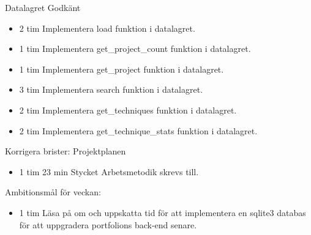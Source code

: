 \documentclass{TDP003mall}
\begin{document}
Datalagret Godkänt
\begin{itemize}
\item 2 tim Implementera load funktion i datalagret.
\item 1 tim Implementera get\_project\_count funktion i datalagret.
\item 1 tim Implementera  get\_project funktion i datalagret.
\item 3 tim Implementera search funktion i datalagret.
\item 2 tim Implementera get\_techniques funktion i datalagret.
\item 2 tim Implementera get\_technique\_stats funktion i datalagret.
\end{itemize}

Korrigera brister: Projektplanen
\begin{itemize}
\item 1 tim 23 min Stycket Arbetsmetodik skrevs till.
  \end{itemize}

Ambitionsmål för veckan:
\begin{itemize}
\item 1 tim Läsa på om och uppskatta tid för att implementera en sqlite3 databas för att uppgradera portfolions back-end senare.
  \end{itemize}

\newpage
  
\end{document}
